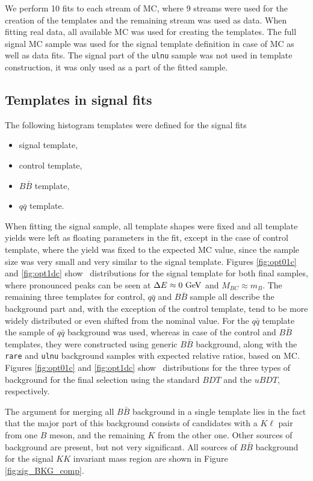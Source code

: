We perform 10 fits to each stream of MC, where 9 streams were used for the creation of the templates and the remaining stream was used as data. When fitting real data, all available MC was used for creating the templates. The full signal MC sample was used for the signal template definition in case of MC as well as data fits. The signal part of the \texttt{ulnu} sample was not used in template construction, it was only used as a part of the fitted sample. 

\subsection{Templates in signal fits}
The following histogram templates were defined for the signal fits
\begin{itemize}
\item signal template,
\item control template,
\item $B \bar B$ template,
\item $q \bar q$ template.
\end{itemize}

When fitting the signal sample, all template shapes were fixed and all template yields were left as floating parameters in the fit, except in the case of control template, where the yield was fixed to the expected MC value, since the sample size was very small and very similar to the signal template. Figures \ref{fig:opt01c} and \ref{fig:opt1dc} show \vars~distributions for the signal template for both final samples, where pronounced peaks can be seen at $\Delta E \approx 0\mathrm{~GeV}$ and $M_{BC} \approx m_B$. The remaining three templates for control, $q \bar q$ and $B \bar B$ sample all describe the background part and, with the exception of the control template, tend to be more widely distributed or even shifted from the nominal value. For the $q \bar q$ template the sample of $q \bar q$ background was used, whereas in case of the control and $B \bar B$ templates, they were constructed using generic $B \bar B$ background, along with the \texttt{rare} and \texttt{ulnu} background samples with expected relative ratios, based on MC. Figures \ref{fig:opt01c} and \ref{fig:opt1dc} show \vars~distributions for the three types of background for the final selection using the standard $BDT$ and the $uBDT$, respectively.

The argument for merging all $B \bar B$ background in a single template lies in the fact that the major part of this background consists of candidates with a $K \ell$ pair from one $B$ meson, and the remaining $K$ from the other one. Other sources of background are present, but not very significant. All sources of $B \bar B$ background for the signal $KK$ invariant mass region are shown in Figure \ref{fig:sig_BKG_comp}.

